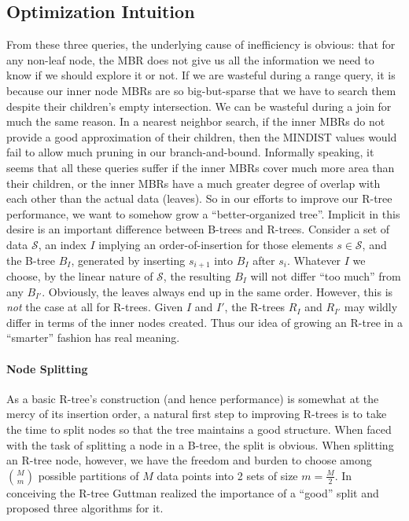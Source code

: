 \subsection{Optimization Intuition}
From these three queries, the underlying cause of inefficiency is obvious: that for any non-leaf node, the MBR does not give us all the information we need to know if we should explore it or not.
If we are wasteful during a range query, it is because our inner node MBRs are so big-but-sparse that we have to search them despite their children's empty intersection.
We can be wasteful during a join for much the same reason.
In a nearest neighbor search, if the inner MBRs do not provide a good approximation of their children, then the MINDIST values would fail to allow much pruning in our branch-and-bound.
Informally speaking, it seems that all these queries suffer if the inner MBRs cover much more area than their children, or the inner MBRs have a much greater degree of overlap with each other than the actual data (leaves).
So in our efforts to improve our R-tree performance, we want to somehow grow a ``better-organized tree''.
Implicit in this desire is an important difference between B-trees and R-trees.
Consider a set of data $\mathcal S$, an index $I$ implying an order-of-insertion for those elements $s\in \mathcal S$, and the B-tree $B_I$, generated by inserting $s_{i+1}$ into $B_I$ after $s_{i}$.
Whatever $I$ we choose, by the linear nature of $\mathcal S$, the resulting $B_I$ will not differ ``too much'' from any $B_{I\prime}$.
Obviously, the leaves always end up in the same order.
However, this is \emph{not} the case at all for R-trees.
Given $I$ and $I\prime$, the R-trees $R_I$ and $R_{I\prime}$ may wildly differ in terms of the inner nodes created.
Thus our idea of growing an R-tree in a ``smarter'' fashion has real meaning.

\paragraph{Node Splitting}
As a basic R-tree's construction (and hence performance) is somewhat at the mercy of its insertion order, a natural first step to improving R-trees is to take the time to split nodes so that the tree maintains a good structure.
When faced with the task of splitting a node in a B-tree, the split is obvious.
When splitting an R-tree node, however, we have the freedom and burden to choose among $\binom{M}{m}$ possible partitions of $M$ data points into 2 sets of size $m=\frac{M}{2}$.
In conceiving the R-tree Guttman realized the importance of a ``good'' split and proposed three algorithms for it.

